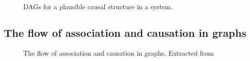 \documentclass[
  authoryear,
  preprint,
  1p]{elsarticle}
\begin{document}
\begin{figure}

\begin{minipage}{0.50\linewidth}



\end{minipage}%
%
\begin{minipage}{0.50\linewidth}



\end{minipage}%

\caption{\label{fig-example}DAGs for a plausible causal structure in a
system.}

\end{figure}%

\subsection{The flow of association and causation in
graphs}\label{sec-framework-flow}

\begin{figure}


\caption{\label{fig-ACflow}The flow of association and causation in
graphs. Extracted from \citet[31]{Neal_2020}}

\end{figure}%
\end{document}

